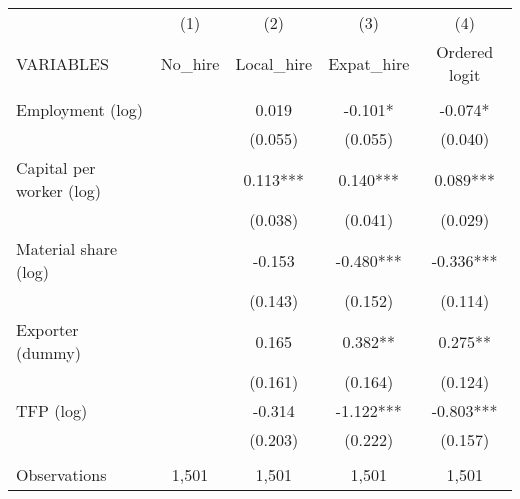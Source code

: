 \begin{tabular}{lcccc} \hline
 & (1) & (2) & (3) & (4) \\
VARIABLES & No\_hire & Local\_hire & Expat\_hire & Ordered logit \\ \hline
 &  &  &  &  \\
Employment (log) &  & 0.019 & -0.101* & -0.074* \\
 &  & (0.055) & (0.055) & (0.040) \\
Capital per worker (log) &  & 0.113*** & 0.140*** & 0.089*** \\
 &  & (0.038) & (0.041) & (0.029) \\
Material share (log) &  & -0.153 & -0.480*** & -0.336*** \\
 &  & (0.143) & (0.152) & (0.114) \\
Exporter (dummy) &  & 0.165 & 0.382** & 0.275** \\
 &  & (0.161) & (0.164) & (0.124) \\
TFP (log) &  & -0.314 & -1.122*** & -0.803*** \\
 &  & (0.203) & (0.222) & (0.157) \\
 &  &  &  &  \\
 Observations & 1,501 & 1,501 & 1,501 & 1,501 \\ \hline
\end{tabular}
